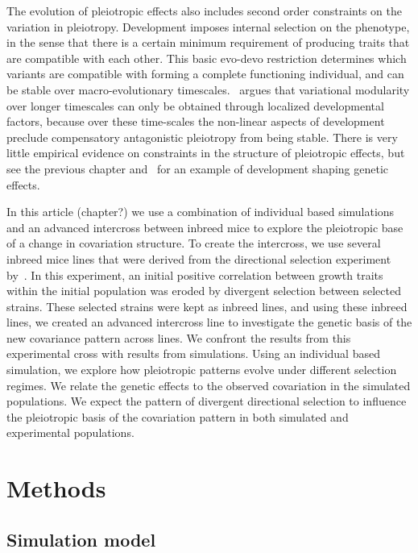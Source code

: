 \begin{refsection}
The evolution of pleiotropic effects also includes second order constraints on
the variation in pleiotropy. Development imposes internal selection on the
phenotype, in the sense that there is a certain minimum requirement of
producing traits that are compatible with each other. This basic evo-devo
restriction determines which variants are compatible with forming a complete
functioning individual, and can be stable over macro-evolutionary
timescales.~\textcite{Mitteroecker2009-jb} argues that variational modularity
over longer timescales can only be obtained through localized developmental
factors, because over these time-scales the non-linear aspects of development
preclude compensatory antagonistic pleiotropy from being stable. There is very little
empirical evidence on constraints in the structure of pleiotropic effects, but
see the previous chapter and~\textcite{Pavlicev2016-jh} for an example of
development shaping genetic effects.

In this article (chapter?) we use a combination of individual based
simulations and an advanced intercross between inbreed mice to explore the
pleiotropic base of a change in covariation structure. To create the
intercross, we use several inbreed mice lines that were derived from the
directional selection experiment by~\textcite{Atchley1997-vn}. In this
experiment, an initial positive correlation between growth traits within the
initial population was eroded by divergent selection between selected strains.
These selected strains were kept as inbreed lines, and using these inbreed lines, we
created an advanced intercross line to investigate the genetic basis of the new
covariance pattern across lines. We confront the results from this
experimental cross with results from simulations. Using an individual based
simulation, we explore how pleiotropic patterns evolve under different
selection regimes. We relate the genetic effects to the observed covariation
in the simulated populations. We expect the pattern of divergent directional
selection to influence the pleiotropic basis of the covariation pattern in
both simulated and experimental populations.


\section{Methods}

\subsection{Simulation model}


\end{refsection}
